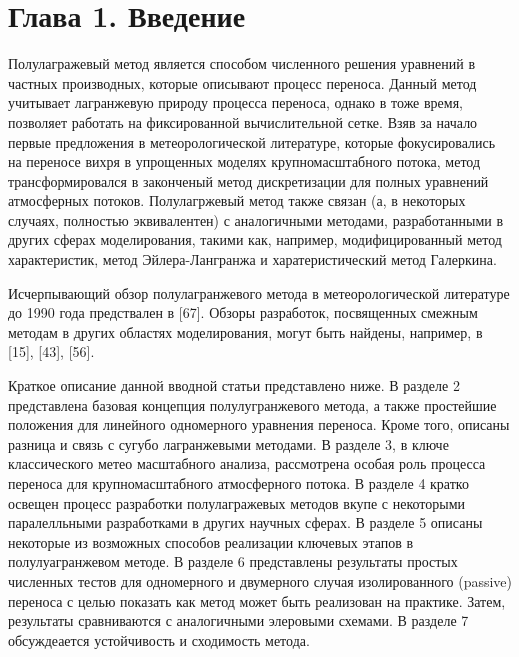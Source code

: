\chapter*{Глава 1. Введение} \label{chapt1}

Полулагражевый метод является способом численного решения уравнений в частных производных, которые описывают процесс переноса. Данный метод учитывает лагранжевую природу процесса переноса, однако в тоже время, позволяет работать на фиксированной вычислительной сетке. Взяв за начало первые предложения в метеорологической литературе, которые фокусировались на переносе вихря в упрощенных моделях крупномасштабного потока, метод трансформировался в законченый метод дискретизации для полных уравнений атмосферных потоков. Полулагржевый метод также связан (а, в некоторых случаях, полностью эквивалентен) с аналогичными методами, разработанными в других сферах моделирования, такими как, например, модифицированный метод характеристик, метод Эйлера-Лангранжа и харатеристический метод Галеркина. 

Исчерпывающий обзор полулагранжевого метода в метеорологической литературе до 1990 года предствален в [67]. Обзоры разработок, посвященных смежным методам в других областях моделирования, могут быть найдены, например, в [15], [43], [56].

Краткое описание данной вводной статьи представлено ниже. В разделе 2 представлена базовая концепция полулугранжевого метода, а также простейшие положения для линейного одномерного уравнения переноса. Кроме того, описаны разница и связь с сугубо лагранжевыми методами. В разделе 3, в ключе классического метео масштабного анализа, рассмотрена особая роль процесса переноса для крупномасштабного атмосферного потока. В разделе 4 кратко освещен процесс разработки полулагражевых методов вкупе с некоторыми паралелльными разработками в других научных сферах. В разделе 5 описаны некоторые из возможных способов реализации ключевых этапов в полулуагранжевом методе. В разделе 6 представлены результаты простых численных тестов для одномерного и двумерного случая изолированного (passive) переноса с целью показать как метод может быть реализован на практике. Затем, результаты сравниваются с аналогичными элеровыми схемами. В разделе 7 обсуждеается устойчивость и сходимость метода.

